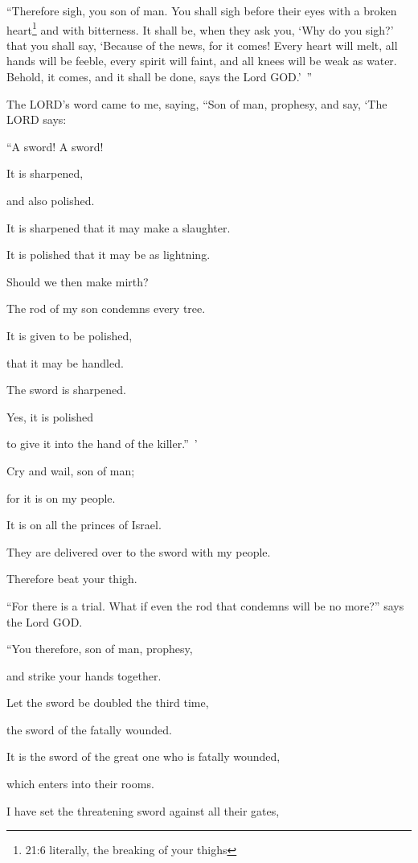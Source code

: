 \myverse{}“Therefore sigh, you son of man. You shall sigh before their eyes
with a broken heart\footnote{21:6 literally, the breaking of your thighs} and with bitterness.
\myverse{}It shall be, when they ask you, ‘Why do you sigh?’ that you shall say, ‘Because
of the news, for it comes! Every heart will melt, all hands will be feeble, every spirit will faint, and
all knees will be weak as water. Behold, it comes, and it shall be done, says the Lord GOD.’ ”

\myverse{}The LORD’s word came to me, saying,
\myverse{}“Son of man, prophesy, and say, ‘The LORD says:

“A sword! A sword!

It is sharpened,

and also polished.

\myverse{}It is sharpened that it may make a slaughter.

It is polished that it may be as lightning.

Should we then make mirth?

The rod of my son condemns every tree.

\myverse{}It is given to be polished,

that it may be handled.

The sword is sharpened.

Yes, it is polished

to give it into the hand of the killer.” ’

\myverse{}Cry and wail, son of man;

for it is on my people.

It is on all the princes of Israel.

They are delivered over to the sword with my people.

Therefore beat your thigh.


\vspace{\baselineskip} \myverse{}“For there is a trial. What if even the rod that condemns will
be no more?” says the Lord GOD.

\myverse{}“You therefore, son of man, prophesy,

and strike your hands together.

Let the sword be doubled the third time,

the sword of the fatally wounded.

It is the sword of the great one who is fatally wounded,

which enters into their rooms.

\myverse{}I have set the threatening sword against all their gates,


